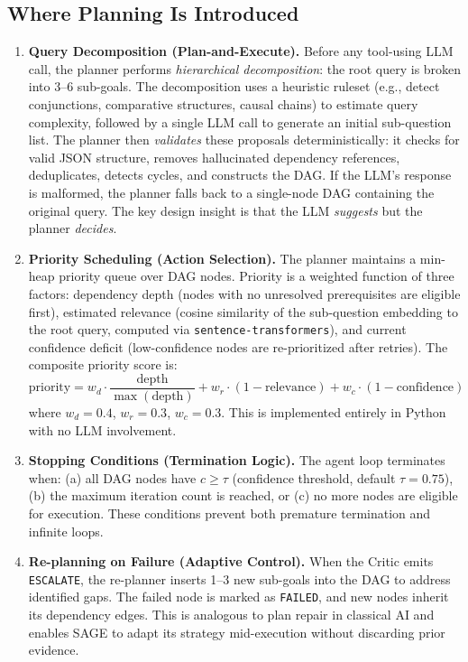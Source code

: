 \documentclass[11pt]{article}
\begin{document}
\subsection{Where Planning Is Introduced}

\begin{enumerate}[leftmargin=1.5em, label=\textbf{\arabic{enumi}.}, itemsep=4pt]

  \item \textbf{Query Decomposition (Plan-and-Execute).}
  Before any tool-using LLM call, the planner performs \emph{hierarchical decomposition}: the root
  query is broken into 3--6 sub-goals. The decomposition uses a heuristic ruleset (e.g., detect conjunctions,
  comparative structures, causal chains) to estimate query complexity, followed by a single LLM call to generate
  an initial sub-question list. The planner then \emph{validates} these proposals deterministically: it checks for valid JSON structure, removes hallucinated dependency references, deduplicates, detects cycles, and constructs the DAG. If the LLM's response is malformed, the planner falls back to a single-node DAG containing the original query. The key design insight is that the LLM \emph{suggests} but the planner \emph{decides}.

  \item \textbf{Priority Scheduling (Action Selection).}
  The planner maintains a min-heap priority queue over DAG nodes. Priority is a weighted function
  of three factors: dependency depth (nodes with no unresolved prerequisites are eligible first), estimated
  relevance (cosine similarity of the sub-question embedding to the root query, computed via \texttt{sentence-transformers}), and current confidence deficit (low-confidence nodes are re-prioritized after retries). The composite priority score is:
  \[
  \text{priority} = w_d \cdot \frac{\text{depth}}{\max(\text{depth})} + w_r \cdot (1 - \text{relevance}) + w_c \cdot (1 - \text{confidence})
  \]
  where $w_d = 0.4$, $w_r = 0.3$, $w_c = 0.3$. This is
  implemented entirely in Python with no LLM involvement.

  \item \textbf{Stopping Conditions (Termination Logic).}
  The agent loop terminates when: (a) all DAG nodes have $c \geq \tau$ (confidence
  threshold, default $\tau=0.75$), (b) the maximum iteration count is reached, or (c)
  no more nodes are eligible for execution. These conditions prevent both premature termination and infinite loops.

  \item \textbf{Re-planning on Failure (Adaptive Control).}
  When the Critic emits \texttt{ESCALATE}, the re-planner inserts 1--3 new sub-goals into the
  DAG to address identified gaps. The failed node is marked as \texttt{FAILED}, and new nodes inherit its dependency edges. This is analogous to plan repair in classical AI and enables
  SAGE to adapt its strategy mid-execution without discarding prior evidence.


\end{enumerate}
\end{document}
